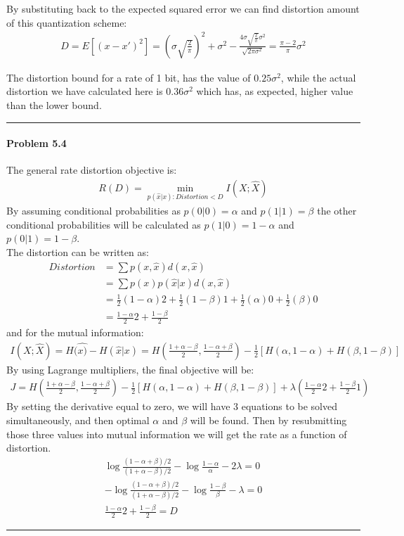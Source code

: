 \documentclass[12pt, letterpaper]{scrartcl}
\begin{document}
By substituting back to the expected squared error we can find distortion amount of this quantization scheme:
\begin{align*}
    D=E[(x-x')^2]=(\sigma\sqrt{\frac{2}{\pi}})^2+\sigma^2-\frac{4\sigma\sqrt{\frac{2}{\pi}}\sigma^2}{\sqrt{2\pi\sigma^2}}=\frac{\pi-2}{\pi}\sigma^2
\end{align*}

The distortion bound for a rate of 1 bit, has the value of $0.25\sigma^2$, while the actual distortion we have calculated here is $0.36\sigma^2$ which has, as expected, higher value than the lower bound.\\
\hrule

\paragraph*{Problem 5.4} \hfill\newline
The general rate distortion objective is:
\begin{align*}
    R(D)=\min_{p(\hat{x}|x):Distortion<D} I(X;\hat{X}) 
\end{align*}
By assuming conditional probabilities as $p(0|0)=\alpha$ and $p(1|1)=\beta$ the other conditional probabilities will be calculated as $p(1|0)=1-\alpha$ and $p(0|1)=1-\beta$. \\
The distortion can be written as:
\begin{align*}
    Distortion&=\sum p(x,\hat{x})d(x, \hat{x})\\
    &=\sum p(x)p(\hat{x}|x)d(x,\hat{x})\\
    &=\frac{1}{2}(1-\alpha)2+\frac{1}{2}(1-\beta)1 + \frac{1}{2}(\alpha)0+ \frac{1}{2}(\beta)0\\
    &=\frac{1-\alpha}{2}2+\frac{1-\beta}{2}
\end{align*}
and for the mutual information:
\begin{align*}
    I(X;\hat{X})=H(\hat{x)}-H(\hat{x}|x)=H(\frac{1+\alpha-\beta}{2}, \frac{1-\alpha+\beta}{2})-\frac{1}{2}[H(\alpha, 1-\alpha) + H(\beta, 1-\beta)]
\end{align*}
By using Lagrange multipliers, the final objective will be:
\begin{align*}
    J=H(\frac{1+\alpha-\beta}{2}, \frac{1-\alpha+\beta}{2})-\frac{1}{2}[H(\alpha, 1-\alpha) + H(\beta, 1-\beta)]+\lambda(\frac{1-\alpha}{2}2+\frac{1-\beta}{2}1)
\end{align*}
By setting the derivative equal to zero, we will have 3 equations to be solved simultaneously, and then optimal $\alpha$ and $\beta$ will be found. Then by resubmitting those three values into mutual information we will get the rate as a function of distortion.
\begin{align*}
    \log\frac{(1-\alpha+\beta)/2}{(1+\alpha-\beta)/2}-\log\frac{1-\alpha}{\alpha}-2\lambda=0\\
    -\log\frac{(1-\alpha+\beta)/2}{(1+\alpha-\beta)/2}-\log\frac{1-\beta}{\beta}-\lambda=0\\
    \frac{1-\alpha}{2}2+\frac{1-\beta}{2}=D
\end{align*}
\hrule
\end{document}
